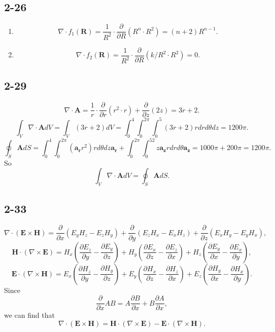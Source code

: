 \documentclass[6pt,a4paper]{article}
\begin{document}
\subsection{2-26}
\begin{enumerate}[label=\alph*)]
\item
$$\nabla\cdot f_1(\mathbf{R})=\frac{1}{R^2}\cdot\frac{\partial}{\partial R}(R^n\cdot R^2)=(n+2)R^{n-1}.$$
\item
$$\nabla\cdot f_2(\mathbf{R})=\frac{1}{R^2}\cdot\frac{\partial}{\partial R}(k/R^2\cdot R^2)=0.$$
\end{enumerate}

\subsection{2-29}
$$\nabla\cdot\mathbf{A}=\frac{1}{r}\cdot\frac{\partial}{\partial r}(r^2\cdot r)+\frac{\partial}{\partial z}(2z)=3r+2.$$
$$\int_V\nabla\cdot\mathbf{A}dV=\int_V(3r+2)dV=\int_0^4\int_0^{2\pi}\int_0^5(3r+2)rdrd\theta dz=1200\pi.$$
$$\oint_S\mathbf{A}dS=\int_0^4\int_0^{2\pi}(\mathbf{a_r}r^2)rd\theta dz\mathbf{a_r}+\int_0^{2\pi}\int_0^52z\mathbf{a_z}rdrd\theta\mathbf{a_z}=1000\pi+200\pi=1200\pi.$$
So $$\int_V\nabla\cdot\mathbf{A}dV=\oint_S\mathbf{A}dS.$$

\subsection{2-33}
$$\nabla\cdot(\mathbf{E}\times\mathbf{H})=\frac{\partial}{\partial x}(E_yH_z-E_zH_y)+\frac{\partial}{\partial y}(E_zH_x-E_xH_z)+\frac{\partial}{\partial z}(E_xH_y-E_yH_x),$$
$$\mathbf{H}\cdot(\nabla\times\mathbf{E})=H_x\left(\frac{\partial E_z}{\partial y}-\frac{\partial E_y}{\partial z}\right)+H_y\left(\frac{\partial E_x}{\partial z}-\frac{\partial E_z}{\partial x}\right)+H_z\left(\frac{\partial E_y}{\partial x}-\frac{\partial E_x}{\partial y}\right),$$
$$\mathbf{E}\cdot(\nabla\times\mathbf{H})=E_x\left(\frac{\partial H_z}{\partial y}-\frac{\partial H_y}{\partial z}\right)+E_y\left(\frac{\partial H_x}{\partial z}-\frac{\partial H_z}{\partial x}\right)+E_z\left(\frac{\partial H_y}{\partial x}-\frac{\partial H_x}{\partial y}\right).$$
Since
$$\frac{\partial}{\partial x}AB=A\frac{\partial B}{\partial x}+B\frac{\partial A}{\partial x},$$
we can find that
$$\nabla\cdot(\mathbf{E}\times\mathbf{H})=\mathbf{H}\cdot(\nabla\times\mathbf{E})-\mathbf{E}\cdot(\nabla\times\mathbf{H}).$$
\end{document}
